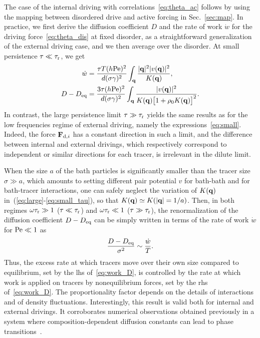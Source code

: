 \documentclass[superscriptaddress, twocolumn, prx, longbibliography, nofootinbib]{revtex4-1}
\begin{document}
The case of the internal driving with correlations~\eqref{eq:theta_ac} follows by using the mapping between disordered drive and active forcing in Sec.~\ref{sec:map}. In practice, we first derive the diffusion coefficient $D$ and the rate of work $\dot w$ for the driving force~\eqref{eq:theta_dis} at fixed disorder, as a straightforward generalization of the external driving case, and we then average over the disorder. At small persistence $\tau\ll\tau_{\rm r}$, we get
\begin{equation}\label{eq:small_tau}
	\begin{aligned}
		\dot w &=  \frac{\tau T(h{\rm Pe})^2}{d(\sigma\gamma)^2} \int_{\bf q} \frac{|{\bf q}|^2 |v({\bf q})|^2}{K({\bf q})} ,
		\\
		D-D_{\rm eq} &= \frac{3\tau(h{\rm Pe})^2}{d(\sigma\gamma)^2} \int_{\bf q}\frac{|v({\bf q})|^2 } {K({\bf q})\big[1 + \rho_0 K({\bf q})\big]^2} .
	\end{aligned}
\end{equation}
In contrast, the large persistence limit $\tau\gg\tau_{\rm r}$ yields the same results as for the low frequencies regime of external driving, namely the expressions~\eqref{eq:small}. Indeed, the force ${\bf F}_{{\rm d},i}$ has a constant direction in such a limit, and the difference between internal and external drivings, which respectively correspond to independent or similar directions for each tracer, is irrelevant in the dilute limit.


When the size $a$ of the bath particles is significantly smaller than the tracer size $\sigma\gg a$, which amounts to setting different pair potential $v$ for bath-bath and for bath-tracer interactions, one can safely neglect the variation of $K({\bf q})$ in~(\ref{eq:large}-\ref{eq:small_tau}), so that $K({\bf q}) \simeq K(|{\bf q}|=1/a)$. Then, in both regimes $\omega\tau_{\rm r}\gg 1$ ($\tau\ll\tau_{\rm r}$) and $\omega\tau_{\rm r}\ll 1$ ($\tau\gg\tau_{\rm r}$), the renormalization of the diffusion coefficient $D-D_{\rm eq}$ can be simply written in terms of the rate of work $\dot w$ for ${\rm Pe}\ll1$ as
\begin{equation}\label{eq:work_D}
	\frac{D-D_{\rm eq}}{\sigma^2} \sim \frac{\dot w}{T} .
\end{equation}
Thus, the excess rate at which tracers move over their own size compared to equilibrium, set by the lhs of~\eqref{eq:work_D}, is controlled by the rate at which work is applied on tracers by nonequilibrium forces, set by the rhs of~\eqref{eq:work_D}. The proportionality factor depends on the details of interactions and of density fluctuations. Interestingly, this result is valid both for internal and external drivings. It corroborates numerical observations obtained previously in a system where composition-dependent diffusion constants can lead to phase transitions~\cite{delJunco2018}.
\end{document}
